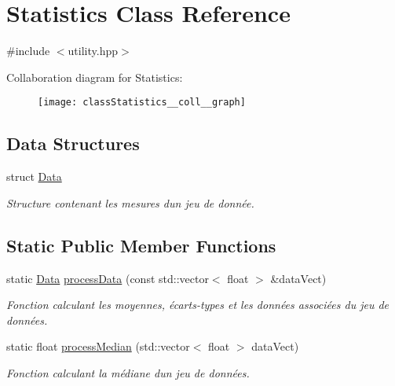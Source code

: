 \hypertarget{classStatistics}{}\section{Statistics Class Reference}
\label{classStatistics}


{\ttfamily \#include $<$utility.\+hpp$>$}



Collaboration diagram for Statistics\+:
\nopagebreak
\begin{figure}[H]
\begin{center}
\leavevmode
\texttt{[image: classStatistics\_\_coll\_\_graph]}
\end{center}
\end{figure}
\subsection*{Data Structures}
\begin{DoxyCompactItemize}
\item 
struct \hyperlink{structStatistics_1_1Data}{Data}
\begin{DoxyCompactList}\small\item\em Structure contenant les mesures d\textquotesingle{}un jeu de donnée. \end{DoxyCompactList}\end{DoxyCompactItemize}
\subsection*{Static Public Member Functions}
\begin{DoxyCompactItemize}
\item 
static \hyperlink{structStatistics_1_1Data}{Data} \hyperlink{classStatistics_aaa2152a3f262ce8d003663f993420c4c}{process\+Data} (const std\+::vector$<$ float $>$ \&data\+Vect)
\begin{DoxyCompactList}\small\item\em Fonction calculant les moyennes, écarts-\/types et les données associées du jeu de données. \end{DoxyCompactList}\item 
static float \hyperlink{classStatistics_ae1c12077162711aa0ea8b4ee6e15b4da}{process\+Median} (std\+::vector$<$ float $>$ data\+Vect)
\begin{DoxyCompactList}\small\item\em Fonction calculant la médiane d\textquotesingle{}un jeu de données. \end{DoxyCompactList}\end{DoxyCompactItemize}


